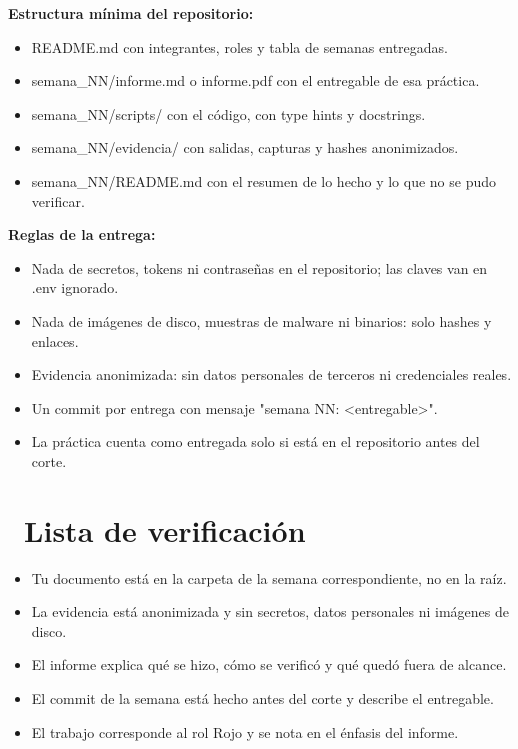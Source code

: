 \documentclass[11pt,a4paper]{article}
\newcommand{\iconotexto}[2]{\textcolor{cyanNeon}{\faIcon{#1}}~#2}
\begin{document}
\textbf{Estructura mínima del repositorio:}

\begin{itemize}[leftmargin=1.4em,itemsep=2pt,topsep=3pt]
  \item README.md con integrantes, roles y tabla de semanas entregadas.
  \item semana\_NN/informe.md o informe.pdf con el entregable de esa práctica.
  \item semana\_NN/scripts/ con el código, con type hints y docstrings.
  \item semana\_NN/evidencia/ con salidas, capturas y hashes anonimizados.
  \item semana\_NN/README.md con el resumen de lo hecho y lo que no se pudo verificar.
\end{itemize}

\textbf{Reglas de la entrega:}

\begin{itemize}[leftmargin=1.4em,itemsep=2pt,topsep=3pt]
  \item Nada de secretos, tokens ni contraseñas en el repositorio; las claves van en .env ignorado.
  \item Nada de imágenes de disco, muestras de malware ni binarios: solo hashes y enlaces.
  \item Evidencia anonimizada: sin datos personales de terceros ni credenciales reales.
  \item Un commit por entrega con mensaje "semana NN: \textless{}entregable\textgreater{}".
  \item La práctica cuenta como entregada solo si está en el repositorio antes del corte.
\end{itemize}

\section{\iconotexto{clipboard-check}{Lista de verificación}}

\begin{itemize}[leftmargin=1.4em,itemsep=2pt,topsep=3pt]
  \item Tu documento está en la carpeta de la semana correspondiente, no en la raíz.
  \item La evidencia está anonimizada y sin secretos, datos personales ni imágenes de disco.
  \item El informe explica qué se hizo, cómo se verificó y qué quedó fuera de alcance.
  \item El commit de la semana está hecho antes del corte y describe el entregable.
  \item El trabajo corresponde al rol Rojo y se nota en el énfasis del informe.
\end{itemize}
\end{document}
